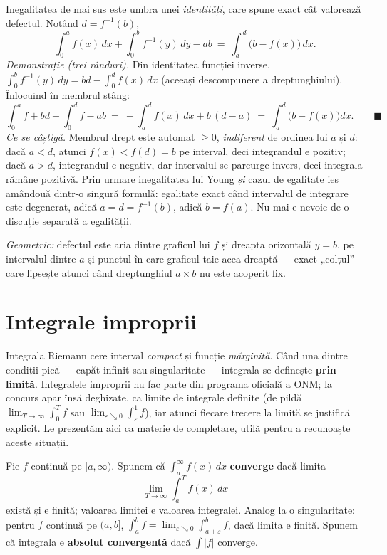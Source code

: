 \begin{obs}
Inegalitatea de mai sus este umbra unei \emph{identități}, care spune exact cât valorează defectul. Notând $d=f^{-1}(b)$,
\[
\int_0^a f(x)\,dx+\int_0^b f^{-1}(y)\,dy-ab\ =\ \int_a^{\,d}\bigl(b-f(x)\bigr)\,dx .
\]
\emph{Demonstrație (trei rânduri).} Din identitatea funcției inverse, $\int_0^b f^{-1}(y)\,dy=bd-\int_0^d f(x)\,dx$ (aceeași descompunere a dreptunghiului). Înlocuind în membrul stâng:
\[
\int_0^a f+bd-\int_0^d f-ab\ =\ -\int_a^{d} f(x)\,dx+b\,(d-a)\ =\ \int_a^{d}\bigl(b-f(x)\bigr)dx . \qquad\blacksquare
\]
\emph{Ce se câștigă.} Membrul drept este automat $\ge0$, \emph{indiferent} de ordinea lui $a$ și $d$: dacă $a<d$, atunci $f(x)<f(d)=b$ pe interval, deci integrandul e pozitiv; dacă $a>d$, integrandul e negativ, dar intervalul se parcurge invers, deci integrala rămâne pozitivă. Prin urmare inegalitatea lui Young \emph{și} cazul de egalitate ies amândouă dintr-o singură formulă: egalitate exact când intervalul de integrare este degenerat, adică $a=d=f^{-1}(b)$, adică $b=f(a)$. Nu mai e nevoie de o discuție separată a egalității.

\emph{Geometric:} defectul este aria dintre graficul lui $f$ și dreapta orizontală $y=b$, pe intervalul dintre $a$ și punctul în care graficul taie acea dreaptă --- exact „colțul'' care lipsește atunci când dreptunghiul $a\times b$ nu este acoperit fix.
\end{obs}


\section{Integrale improprii}

Integrala Riemann cere interval \emph{compact} și funcție \emph{mărginită}. Când una dintre condiții pică --- capăt infinit sau singularitate --- integrala se definește \textbf{prin limită}. Integralele improprii nu fac parte din programa oficială a ONM; la concurs apar însă deghizate, ca limite de integrale definite (de pildă $\lim_{T\to\infty}\int_0^T f$ sau $\lim_{\varepsilon\searrow0}\int_\varepsilon^1 f$), iar atunci fiecare trecere la limită se justifică explicit. Le prezentăm aici ca materie de completare, utilă pentru a recunoaște aceste situații.

\begin{definitie}
Fie $f$ continuă pe $[a,\infty)$. Spunem că $\displaystyle\int_a^{\infty}f(x)\,dx$ \textbf{converge} dacă limita
\[
\lim_{T\to\infty}\int_a^{T}f(x)\,dx
\]
există și e finită; valoarea limitei e valoarea integralei. Analog la o singularitate: pentru $f$ continuă pe $(a,b]$, $\int_a^b f=\lim_{\varepsilon\searrow0}\int_{a+\varepsilon}^b f$, dacă limita e finită. Spunem că integrala e \textbf{absolut convergentă} dacă $\int|f|$ converge.
\end{definitie}

